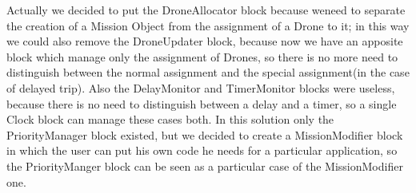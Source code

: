 Actually we decided to put the DroneAllocator block because weneed to separate the creation of a Mission Object from the assignment of a Drone to it; in this way we could also remove the DroneUpdater block, because now we have an apposite block which manage only the assignment of Drones, so there is no more need to distinguish between the normal assignment and the special assignment(in the case of delayed trip).
Also the DelayMonitor and TimerMonitor blocks were useless, because there is no need to distinguish between a delay and a timer, so a single Clock block can manage these cases both.
In this solution only the PriorityManager block existed, but we decided to create a MissionModifier block in which the user can put his own code he needs for a particular application, so the PriorityManger block can be seen as a particular case of the MissionModifier one.